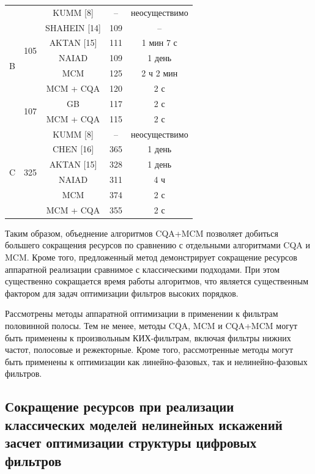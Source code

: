 \begin{table}[htbp]
\begin{tabular}{|c|c|c|c|c|}
		\multirow{8}{*}{B}
		& \multirow{6}{*}{105}
		& KUMM [8]        & --  & неосуществимо \\
		& & SHAHEIN [14]  & 109 & -- \\
		& & AKTAN [15]    & 111 & 1 мин 7 с \\
		& & NAIAD         & 109 & 1 день \\
		& & MCM           & 125 & 2 ч 2 мин \\
		& & MCM + CQA     & 120 & 2 с \\
		\cline{2-5}
		& \multirow{2}{*}{107}
		& GB              & 117 & 2 с \\
		& & MCM + CQA     & 115 & 2 с \\
		\hline
		
		\multirow{6}{*}{C}
		& \multirow{6}{*}{325}
		& KUMM [8]        & --  & неосуществимо \\
		& & CHEN [16]     & 365 & 1 день \\
		& & AKTAN [15]    & 328 & 1 день \\
		& & NAIAD         & 311 & 4 ч \\
		& & MCM           & 374 & 2 с \\
		& & MCM + CQA     & 355 & 2 с \\
		\hline
		
	\end{tabular}
\end{table}

Таким образом, объеднение алгоритмов CQA+MCM позволяет добиться большего сокращения ресурсов по сравнению с отдельными алгоритмами CQA и MCM. Кроме того, предложенный метод демонстрирует сокращение ресурсов аппаратной реализации сравнимое с классическими подходами. При этом существенно сокращается время работы алгоритмов, что является существенным фактором для задач оптимизации фильтров высоких порядков.

Рассмотрены методы аппаратной оптимизации в применении к фильтрам половинной полосы. Тем не менее, методы CQA, MCM и CQA+MCM могут быть применены к произвольным КИХ-фильтрам, включая фильтры нижних частот, полосовые и режекторные. Кроме того, рассмотренные методы могут быть применены к оптимизации как линейно-фазовых, так и нелинейно-фазовых фильтров.

\subsection{Сокращение ресурсов при реализации классических моделей нелинейных искажений засчет оптимизации структуры цифровых фильтров}

